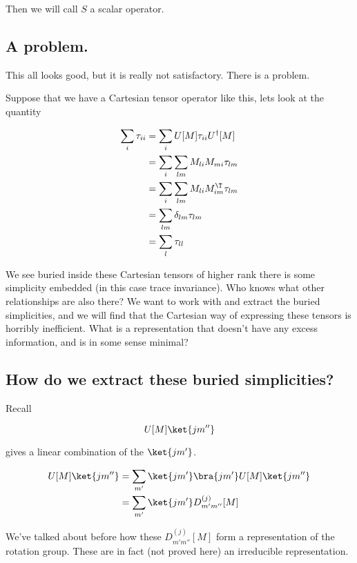 Then we will call $S$ a scalar operator.

\subsection{A problem.}

This all looks good, but it is really not satisfactory.  There is a problem.

Suppose that we have a Cartesian tensor operator like this, lets look at the quantity

\begin{align*}
\sum_i \tau_{ii}
&=
\sum_i
U[M] \tau_{ii} U^\dagger[M]  \\
&= 
\sum_i
\sum_{lm} M_{li} M_{mi} \tau_{lm} 
\\
&= 
\sum_i
\sum_{lm} M_{li} M_{im}^\T \tau_{lm} 
\\
&= 
\sum_{lm} \delta_{lm} \tau_{lm} 
\\
&= 
\sum_{l} \tau_{ll} 
\end{align*}

We see buried inside these Cartesian tensors of higher rank there is some simplicity embedded (in this case trace invariance).  Who knows what other relationships are also there?  We want to work with and extract the buried simplicities, and we will find that the Cartesian way of expressing these tensors is horribly inefficient.  What is a representation that doesn't have any excess information, and is in some sense minimal?

\subsection{How do we extract these buried simplicities?}

Recall 

\begin{equation}\label{eqn:qmTwoL19:n}
U[M] \ket{j m''} 
\end{equation}

gives a linear combination of the $\ket{j m'}$.

\begin{align*}
U[M] \ket{j m''} 
&=
\sum_{m'} \ket{j m'} \bra{j m'} U[M] \ket{j m''}  
\\
&=
\sum_{m'} \ket{j m'} 
D^{(j)}_{m' m''}[M] 
\\
\end{align*}

We've talked about before how these $D^{(j)}_{m' m''}[M]$ form a representation of the rotation group.  These are in fact (not proved here) an irreducible representation.

